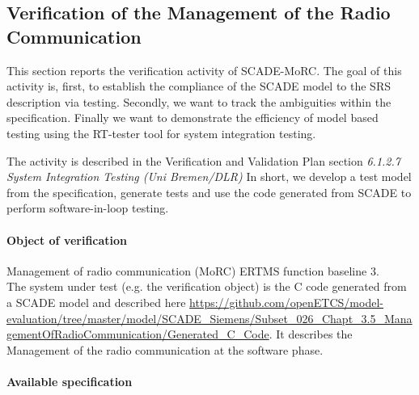 
\newcommand{\tbi}[1]{$<$\textit{#1}$>$}

\newcommand{\nl}{\mbox{}\\}
\newcommand{\nlskip}[1]{\mbox{}\\[#1]}

%
\newcommand{\cmmnt}[1]{\framebox{#1}}
\newcommand{\bgcmmnt}[1]{\nl\framebox{\parbox{.95\textwidth}{#1}}\nl[2mm]}
%

\newcommand{\eod}{\nl\rule{.95\textwidth}{1pt}\nl\textit{End of Document}}


\subsection{Verification of the  Management of the Radio Communication}

This section reports the verification activity of SCADE-MoRC. The goal
of this activity is, first, to establish the compliance of the SCADE
model to the SRS description via testing. Secondly, we want to track
the ambiguities within the specification. Finally we want to
demonstrate the efficiency of model based testing using the RT-tester
tool for system integration testing.

The activity is described in the Verification and Validation Plan
section {\em 6.1.2.7 System Integration Testing (Uni Bremen/DLR)} \cite{D4.1_2013}
In short, we develop a test model from the specification, generate tests and use
the code generated from SCADE to perform software-in-loop testing.

\paragraph{Object of verification}
 Management of radio communication (MoRC) ERTMS function baseline 3.
\nl


The system under test (e.g. the verification object) is the C code
generated from a SCADE model and described here
\url{https://github.com/openETCS/model-evaluation/tree/master/model/SCADE_Siemens/Subset_026_Chapt_3.5_ManagementOfRadioCommunication/Generated_C_Code}.
It describes the Management of the radio communication at the software
phase.




\paragraph{Available specification}

